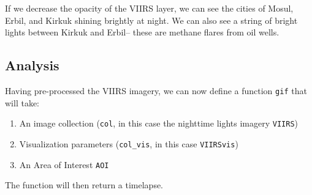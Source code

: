 \documentclass[
  letterpaper,
  DIV=11,
  numbers=noendperiod]{scrreprt}
\providecommand{\tightlist}{%
  \setlength{\itemsep}{0pt}\setlength{\parskip}{0pt}}\usepackage{longtable,booktabs,array}
\begin{document}
If we decrease the opacity of the VIIRS layer, we can see the cities of
Mosul, Erbil, and Kirkuk shining brightly at night. We can also see a
string of bright lights between Kirkuk and Erbil-- these are methane
flares from oil wells.

\hypertarget{analysis-1}{%
\subsection*{Analysis}\label{analysis-1}}

Having pre-processed the VIIRS imagery, we can now define a function
\texttt{gif} that will take:

\begin{enumerate}
\def\labelenumi{\arabic{enumi}.}
\tightlist
\item
  An image collection (\texttt{col}, in this case the nighttime lights
  imagery \texttt{VIIRS})
\item
  Visualization parameters (\texttt{col\_vis}, in this case
  \texttt{VIIRSvis})
\item
  An Area of Interest \texttt{AOI}
\end{enumerate}

The function will then return a timelapse.
\end{document}
